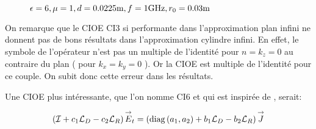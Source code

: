 \begin{figure}[!hbt]
          \caption[CIOE sur empilement de Hoppe & Rahmat-Samii p.~62]{\(\epsilon = 6, \mu = 1, d=0.0225\text{m}, f=1\text{GHz}, r_0=0.03\text{m}\)}
          \label{fig:imp_fourier:plan:hoppe:62:hoibc}
      \end{figure}


    On remarque que le CIOE CI3 si performante dans l'approximation plan infini ne donnent pas de bons résultats dans l’approximation cylindre infini. 
    En effet, le symbole de l'opérateur n'est pas un multiple de l'identité pour \(n=k_z=0\) au contraire du plan ( pour \(k_x=k_y=0\) ). 
    Or la CIOE est multiple de l'identité pour ce couple. 
    On subit donc cette erreur dans les résultats. 

    Une CIOE plus intéressante, que l'on nomme CI6 et qui est inspirée de \cite[p.~60]{hoppe_impedance_1995}, serait:

    \begin{equation}
      \left({\mathcal{I}} + c_1{\mathcal{L}_D} -c_2{\mathcal{L}_R}\right){\overset{\rightarrow}{E}}_t = \left(\operatorname{diag}\left(a_1,a_2\right) + b_1{\mathcal{L}_D} - b_2 {\mathcal{L}_R} \right){\overset{\rightarrow}{J}}
    \end{equation}

